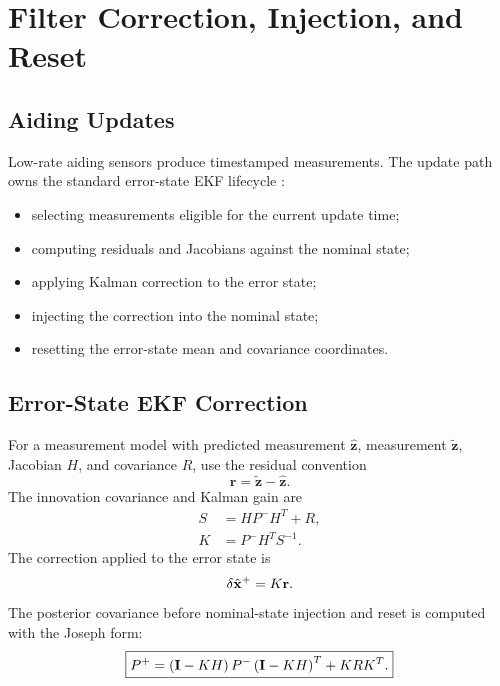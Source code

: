 \chapter{Filter Correction, Injection, and Reset}
\label{chap:filter_correction_reset}

\section{Aiding Updates}

Low-rate aiding sensors produce timestamped measurements. The update path owns
the standard error-state EKF lifecycle \cite{groves2013,simon2006}:
\begin{itemize}
    \item selecting measurements eligible for the current update time;
    \item computing residuals and Jacobians against the nominal state;
    \item applying Kalman correction to the error state;
    \item injecting the correction into the nominal state;
    \item resetting the error-state mean and covariance coordinates.
\end{itemize}

\section{Error-State EKF Correction}

For a measurement model with predicted measurement $\hat{\mathbf{z}}$,
measurement $\tilde{\mathbf{z}}$, Jacobian $H$, and covariance $R$, use the
residual convention
\begin{equation}
\mathbf{r}
=
\tilde{\mathbf{z}}
-
\hat{\mathbf{z}}.
\label{eq:v1_measurement_residual}
\end{equation}
The innovation covariance and Kalman gain are
\begin{align}
S
&=
H P^{-} H^T + R,
\label{eq:v1_innovation_covariance}\\
K
&=
P^{-} H^T S^{-1}.
\label{eq:v1_kalman_gain}
\end{align}
The correction applied to the error state is
\begin{equation}
\delta\hat{\mathbf{x}}^{+}
=
K\mathbf{r}.
\label{eq:v1_error_state_correction}
\end{equation}
The posterior covariance before nominal-state injection and reset is computed
with the Joseph form:
\begin{equation}
\boxed{
P^{+}
=
\left(\mathbf{I}-KH\right)P^{-}\left(\mathbf{I}-KH\right)^T
+
K R K^T.
}
\label{eq:v1_joseph_covariance_update}
\end{equation}

